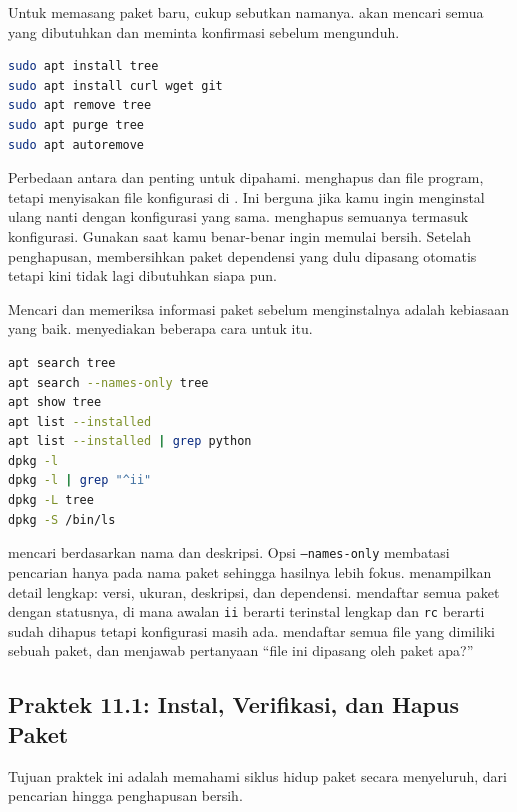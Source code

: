Untuk memasang paket baru, cukup sebutkan namanya.  akan mencari
semua yang dibutuhkan dan meminta konfirmasi sebelum mengunduh.

\begin{lstlisting}[language=bash, caption={Instalasi dan penghapusan paket}]
sudo apt install tree
sudo apt install curl wget git
sudo apt remove tree
sudo apt purge tree
sudo apt autoremove
\end{lstlisting}

Perbedaan antara  dan  penting untuk dipahami.
 menghapus  dan file program, tetapi menyisakan file
konfigurasi di . Ini berguna jika kamu ingin menginstal ulang
nanti dengan konfigurasi yang sama.  menghapus semuanya termasuk
konfigurasi. Gunakan  saat kamu benar-benar ingin memulai bersih.
Setelah penghapusan,  membersihkan paket dependensi yang dulu
dipasang otomatis tetapi kini tidak lagi dibutuhkan siapa pun.

Mencari dan memeriksa informasi paket sebelum menginstalnya adalah kebiasaan
yang baik.  menyediakan beberapa cara untuk itu.

\begin{lstlisting}[language=bash, caption={Mencari dan memeriksa informasi paket}]
apt search tree
apt search --names-only tree
apt show tree
apt list --installed
apt list --installed | grep python
dpkg -l
dpkg -l | grep "^ii"
dpkg -L tree
dpkg -S /bin/ls
\end{lstlisting}

 mencari berdasarkan nama dan deskripsi. Opsi
\texttt{--names-only} membatasi pencarian hanya pada nama paket sehingga
hasilnya lebih fokus.  menampilkan detail lengkap: versi, ukuran,
deskripsi, dan dependensi.  mendaftar semua paket dengan statusnya,
di mana awalan \texttt{ii} berarti terinstal lengkap dan \texttt{rc} berarti
sudah dihapus tetapi konfigurasi masih ada.  mendaftar semua file
yang dimiliki sebuah paket, dan  menjawab pertanyaan ``file ini
dipasang oleh paket apa?''

\subsection*{Praktek 11.1: Instal, Verifikasi, dan Hapus Paket}

Tujuan praktek ini adalah memahami siklus hidup paket secara menyeluruh,
dari pencarian hingga penghapusan bersih.

